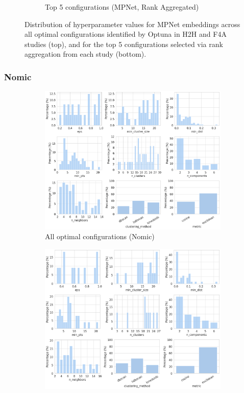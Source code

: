 \documentclass[10pt,oneside]{report}
\begin{document}
\begin{figure}[H]
\begin{subfigure}[b]{0.82\textwidth}
        \caption{Top 5 configurations (MPNet, Rank Aggregated)}
        \label{fig:mpnet_param_plot_top5}
    \end{subfigure}
    \caption{Distribution of hyperparameter values for MPNet embeddings across all optimal configurations identified by Optuna in H2H and F4A studies (top), and for the top 5 configurations selected via rank aggregation from each study (bottom).}
    \label{fig:mpnet_param}
\end{figure}

\subsubsection{Nomic}
\begin{figure}[H]
    \centering
    \begin{subfigure}[b]{0.82\textwidth}
        \centering
        \includegraphics[width=\textwidth]{./images/nomic_param_plot.png}
        \caption{All optimal configurations (Nomic)}
        \label{fig:nomic_param_plot}
    \end{subfigure}
    \begin{subfigure}[b]{0.82\textwidth}
        \centering
        \includegraphics[width=\textwidth]{./images/nomic_param_plot_top5.png}

\end{subfigure}
\end{figure}
\end{document}
